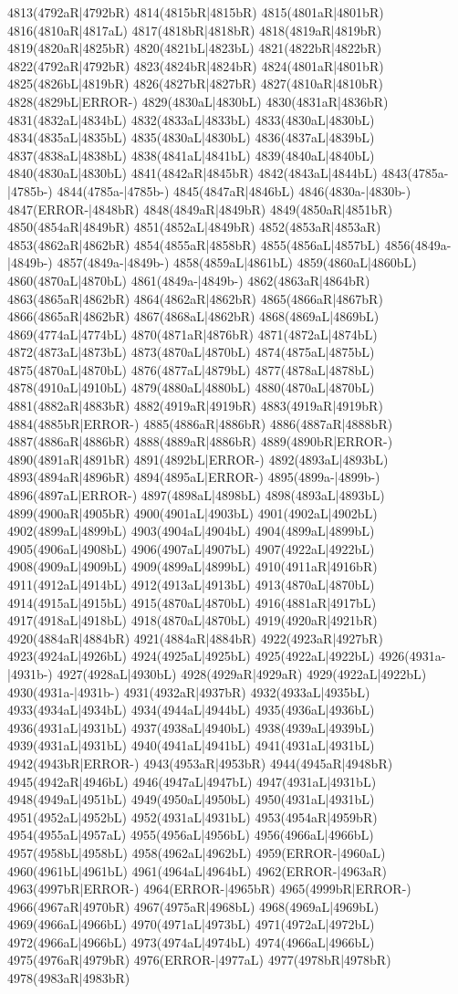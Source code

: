 4813(4792aR|4792bR) 4814(4815bR|4815bR) 4815(4801aR|4801bR) 4816(4810aR|4817aL) 4817(4818bR|4818bR) 4818(4819aR|4819bR) 4819(4820aR|4825bR) 4820(4821bL|4823bL) 4821(4822bR|4822bR) 4822(4792aR|4792bR) 4823(4824bR|4824bR) 4824(4801aR|4801bR) 4825(4826bL|4819bR) 4826(4827bR|4827bR) 4827(4810aR|4810bR) 4828(4829bL|ERROR-) 4829(4830aL|4830bL) 4830(4831aR|4836bR) 4831(4832aL|4834bL) 4832(4833aL|4833bL) 4833(4830aL|4830bL) 4834(4835aL|4835bL) 4835(4830aL|4830bL) 4836(4837aL|4839bL) 4837(4838aL|4838bL) 4838(4841aL|4841bL) 4839(4840aL|4840bL) 4840(4830aL|4830bL) 4841(4842aR|4845bR) 4842(4843aL|4844bL) 4843(4785a-|4785b-) 4844(4785a-|4785b-) 4845(4847aR|4846bL) 4846(4830a-|4830b-) 4847(ERROR-|4848bR) 4848(4849aR|4849bR) 4849(4850aR|4851bR) 4850(4854aR|4849bR) 4851(4852aL|4849bR) 4852(4853aR|4853aR) 4853(4862aR|4862bR) 4854(4855aR|4858bR) 4855(4856aL|4857bL) 4856(4849a-|4849b-) 4857(4849a-|4849b-) 4858(4859aL|4861bL) 4859(4860aL|4860bL) 4860(4870aL|4870bL) 4861(4849a-|4849b-) 4862(4863aR|4864bR) 4863(4865aR|4862bR) 4864(4862aR|4862bR) 4865(4866aR|4867bR) 4866(4865aR|4862bR) 4867(4868aL|4862bR) 4868(4869aL|4869bL) 4869(4774aL|4774bL) 4870(4871aR|4876bR) 4871(4872aL|4874bL) 4872(4873aL|4873bL) 4873(4870aL|4870bL) 4874(4875aL|4875bL) 4875(4870aL|4870bL) 4876(4877aL|4879bL) 4877(4878aL|4878bL) 4878(4910aL|4910bL) 4879(4880aL|4880bL) 4880(4870aL|4870bL) 4881(4882aR|4883bR) 4882(4919aR|4919bR) 4883(4919aR|4919bR) 4884(4885bR|ERROR-) 4885(4886aR|4886bR) 4886(4887aR|4888bR) 4887(4886aR|4886bR) 4888(4889aR|4886bR) 4889(4890bR|ERROR-) 4890(4891aR|4891bR) 4891(4892bL|ERROR-) 4892(4893aL|4893bL) 4893(4894aR|4896bR) 4894(4895aL|ERROR-) 4895(4899a-|4899b-) 4896(4897aL|ERROR-) 4897(4898aL|4898bL) 4898(4893aL|4893bL) 4899(4900aR|4905bR) 4900(4901aL|4903bL) 4901(4902aL|4902bL) 4902(4899aL|4899bL) 4903(4904aL|4904bL) 4904(4899aL|4899bL) 4905(4906aL|4908bL) 4906(4907aL|4907bL) 4907(4922aL|4922bL) 4908(4909aL|4909bL) 4909(4899aL|4899bL) 4910(4911aR|4916bR) 4911(4912aL|4914bL) 4912(4913aL|4913bL) 4913(4870aL|4870bL) 4914(4915aL|4915bL) 4915(4870aL|4870bL) 4916(4881aR|4917bL) 4917(4918aL|4918bL) 4918(4870aL|4870bL) 4919(4920aR|4921bR) 4920(4884aR|4884bR) 4921(4884aR|4884bR) 4922(4923aR|4927bR) 4923(4924aL|4926bL) 4924(4925aL|4925bL) 4925(4922aL|4922bL) 4926(4931a-|4931b-) 4927(4928aL|4930bL) 4928(4929aR|4929aR) 4929(4922aL|4922bL) 4930(4931a-|4931b-) 4931(4932aR|4937bR) 4932(4933aL|4935bL) 4933(4934aL|4934bL) 4934(4944aL|4944bL) 4935(4936aL|4936bL) 4936(4931aL|4931bL) 4937(4938aL|4940bL) 4938(4939aL|4939bL) 4939(4931aL|4931bL) 4940(4941aL|4941bL) 4941(4931aL|4931bL) 4942(4943bR|ERROR-) 4943(4953aR|4953bR) 4944(4945aR|4948bR) 4945(4942aR|4946bL) 4946(4947aL|4947bL) 4947(4931aL|4931bL) 4948(4949aL|4951bL) 4949(4950aL|4950bL) 4950(4931aL|4931bL) 4951(4952aL|4952bL) 4952(4931aL|4931bL) 4953(4954aR|4959bR) 4954(4955aL|4957aL) 4955(4956aL|4956bL) 4956(4966aL|4966bL) 4957(4958bL|4958bL) 4958(4962aL|4962bL) 4959(ERROR-|4960aL) 4960(4961bL|4961bL) 4961(4964aL|4964bL) 4962(ERROR-|4963aR) 4963(4997bR|ERROR-) 4964(ERROR-|4965bR) 4965(4999bR|ERROR-) 4966(4967aR|4970bR) 4967(4975aR|4968bL) 4968(4969aL|4969bL) 4969(4966aL|4966bL) 4970(4971aL|4973bL) 4971(4972aL|4972bL) 4972(4966aL|4966bL) 4973(4974aL|4974bL) 4974(4966aL|4966bL) 4975(4976aR|4979bR) 4976(ERROR-|4977aL) 4977(4978bR|4978bR) 4978(4983aR|4983bR) 